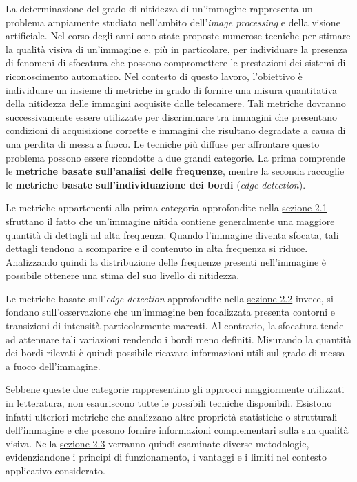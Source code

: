 \documentclass[
    target=bach,
    aauheader=,
    style=
]{thud}
\begin{document}
La determinazione del grado di nitidezza di un'immagine rappresenta un problema ampiamente studiato nell'ambito dell'\textit{image processing} e della visione artificiale. Nel corso degli anni sono state proposte numerose tecniche per stimare la qualità visiva di un'immagine e, più in particolare, per individuare la presenza di fenomeni di sfocatura che possono compromettere le prestazioni dei sistemi di riconoscimento automatico. Nel contesto di questo lavoro, l'obiettivo è individuare un insieme di metriche in grado di fornire una misura quantitativa della nitidezza delle immagini acquisite dalle telecamere. Tali metriche dovranno successivamente essere utilizzate per discriminare tra immagini che presentano condizioni di acquisizione corrette e immagini che risultano degradate a causa di una perdita di messa a fuoco. Le tecniche più diffuse per affrontare questo problema possono essere ricondotte a due grandi categorie. La prima comprende le \textbf{metriche basate sull'analisi delle frequenze}, mentre la seconda raccoglie le \textbf{metriche basate sull'individuazione dei bordi} (\textit{edge detection}).

Le metriche appartenenti alla prima categoria approfondite nella \hyperref[mbsadf]{sezione 2.1} sfruttano il fatto che un'immagine nitida contiene generalmente una maggiore quantità di dettagli ad alta frequenza. Quando l'immagine diventa sfocata, tali dettagli tendono a scomparire e il contenuto in alta frequenza si riduce. Analizzando quindi la distribuzione delle frequenze presenti nell'immagine è possibile ottenere una stima del suo livello di nitidezza.

Le metriche basate sull'\textit{edge detection} approfondite nella \hyperref[mbsed]{sezione 2.2} invece, si fondano sull'osservazione che un'immagine ben focalizzata presenta contorni e transizioni di intensità particolarmente marcati. Al contrario, la sfocatura tende ad attenuare tali variazioni rendendo i bordi meno definiti. Misurando la quantità dei bordi rilevati è quindi possibile ricavare informazioni utili sul grado di messa a fuoco dell'immagine.

Sebbene queste due categorie rappresentino gli approcci maggiormente utilizzati in letteratura, non esauriscono tutte le possibili tecniche disponibili. Esistono infatti ulteriori metriche che analizzano altre proprietà statistiche o strutturali dell'immagine e che possono fornire informazioni complementari sulla sua qualità visiva. Nella \hyperref[altre_metriche]{sezione 2.3} verranno quindi esaminate diverse metodologie, evidenziandone i principi di funzionamento, i vantaggi e i limiti nel contesto applicativo considerato.
\end{document}
